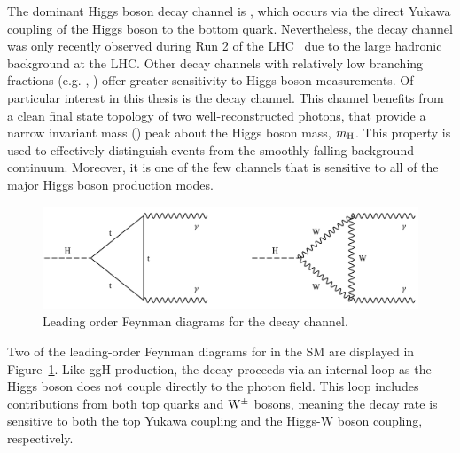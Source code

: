 The dominant Higgs boson decay channel is \Hbb, which occurs via the direct Yukawa coupling of the Higgs boson to the bottom quark. Nevertheless, the \Hbb decay channel was only recently observed during Run 2 of the LHC~\cite{Aaboud:2018zhk,Sirunyan:2018kst} due to the large hadronic background at the LHC. Other decay channels with relatively low branching fractions (e.g. \Hfl, \Hgg) offer greater sensitivity to Higgs boson measurements. Of particular interest in this thesis is the \Hgg decay channel. This channel benefits from a clean final state topology of two well-reconstructed photons, that provide a narrow invariant mass (\mgg) peak about the Higgs boson mass, $m_{\rm{H}}$. This property is used to effectively distinguish \Hgg events from the smoothly-falling background continuum. Moreover, it is one of the few channels that is sensitive to all of the major Higgs boson production modes.

\begin{figure}
  \centering
  \includegraphics[width=.8\linewidth]{Figures/theory/hgg_decay_feynman.png}
  \caption[Leading order Feynman diagrams for the \Hgg decay channel]
  {
    Leading order Feynman diagrams for the \Hgg decay channel.
  }
  \label{fig:hgg_decay}
\end{figure}

Two of the leading-order Feynman diagrams for \Hgg in the SM are displayed in Figure~\ref{fig:hgg_decay}. Like ggH production, the \Hgg decay proceeds via an internal loop as the Higgs boson does not couple directly to the photon field. This loop includes contributions from both top quarks and ${\rm{W}}^{\pm}$ bosons, meaning the \Hgg decay rate is sensitive to both the top Yukawa coupling and the Higgs-W boson coupling, respectively.

